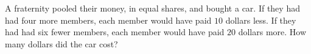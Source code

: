 A fraternity pooled their money, in equal shares, and bought a car. If they had had four more members, each member would have paid $10$ dollars less. If they had had six fewer members, each member would have paid $20$ dollars more. How many dollars did the car cost?
